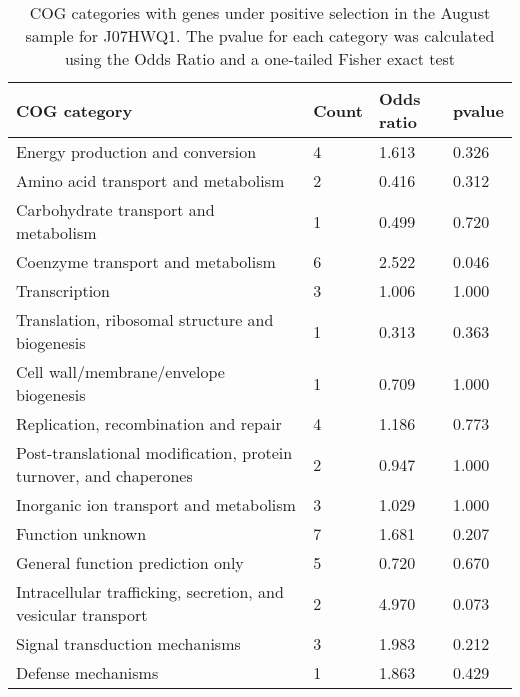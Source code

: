 \begin{table}[hb]
\footnotesize 
	\tabcolsep=0.11cm 
\caption{COG categories with genes under positive selection in the August sample for J07HWQ1. The pvalue for each category was calculated using the Odds Ratio and a one-tailed Fisher exact test \\} 
\begin{tabularx}{\textwidth}{L{6cm}R{2cm}R{2cm}R{2cm}} 
\hline 
\textbf{COG category} & \textbf{Count} & \textbf{Odds ratio} & \textbf{pvalue} \\ 
\hline 
Energy production and conversion & 4 & 1.613 & 0.326 \\ 
Amino acid transport and metabolism & 2 & 0.416 & 0.312 \\ 
Carbohydrate transport and metabolism & 1 & 0.499 & 0.720 \\ 
Coenzyme transport and metabolism & 6 & 2.522 & 0.046 \\ 
Transcription & 3 & 1.006 & 1.000 \\ 
Translation, ribosomal structure and biogenesis & 1 & 0.313 & 0.363 \\ 
Cell wall/membrane/envelope biogenesis & 1 & 0.709 & 1.000 \\ 
Replication, recombination and repair & 4 & 1.186 & 0.773 \\ 
Post-translational modification, protein turnover, and chaperones & 2 & 0.947 & 1.000 \\ 
Inorganic ion transport and metabolism & 3 & 1.029 & 1.000 \\ 
Function unknown & 7 & 1.681 & 0.207 \\ 
General function prediction only & 5 & 0.720 & 0.670 \\ 
Intracellular trafficking, secretion, and vesicular transport & 2 & 4.970 & 0.073 \\ 
Signal transduction mechanisms & 3 & 1.983 & 0.212 \\ 
Defense mechanisms & 1 & 1.863 & 0.429 \\ 
\end{tabularx} 
\label{August_COG_Selection_J07HWQ1} 
 \end{table} 

